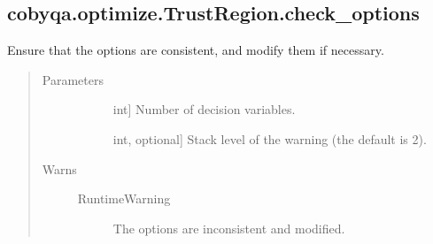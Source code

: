 \documentclass[letterpaper,10pt,english]{sphinxmanual}
\begin{document}
\begin{fulllineitems}
\begin{fulllineitems}
\begin{quote}
\begin{description}
\end{description}\end{quote}

\end{fulllineitems}



\subsection{cobyqa.optimize.TrustRegion.check\_options}
\label{\detokenize{refs/generated/cobyqa.optimize.TrustRegion.check_options:cobyqa-optimize-trustregion-check-options}}\label{\detokenize{refs/generated/cobyqa.optimize.TrustRegion.check_options::doc}}

\begin{fulllineitems}
\label{\detokenize{refs/generated/cobyqa.optimize.TrustRegion.check_options:cobyqa.optimize.TrustRegion.check_options}}
\sphinxAtStartPar
Ensure that the options are consistent, and modify them if necessary.
\begin{quote}\begin{description}
\item[{Parameters}] \leavevmode\begin{description}
\item[{}] \leavevmode{[}int{]}
\sphinxAtStartPar
Number of decision variables.

\item[{}] \leavevmode{[}int, optional{]}
\sphinxAtStartPar
Stack level of the warning (the default is 2).

\end{description}

\item[{Warns}] \leavevmode\begin{description}
\item[{RuntimeWarning}] \leavevmode
\sphinxAtStartPar
The options are inconsistent and modified.

\end{description}

\end{description}\end{quote}


\end{fulllineitems}
\end{fulllineitems}
\end{document}
